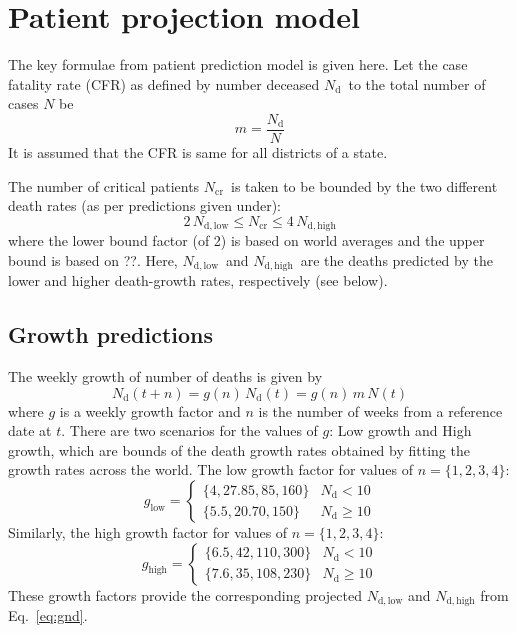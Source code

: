 \documentclass{article}
\newcommand{\nd}{\ensuremath{N_{\mathrm{d}}}}
\newcommand{\ndl}{\ensuremath{N_{\mathrm{d,low}}}}
\newcommand{\ndh}{\ensuremath{N_{\mathrm{d,high}}}}
\newcommand{\ncr}{\ensuremath{N_{\mathrm{cr}}}}
\begin{document}
\appendix
\section{Patient projection model}
The key formulae from patient prediction model \cite{ansualok20} is
given here. Let the case fatality rate (CFR) as defined by number
deceased \nd\ to
the total number of cases $N$ be
\begin{equation}
  m = \frac{\nd}{N}
\end{equation}
It is assumed that the CFR is same for all districts of a state.


The number of critical patients \ncr\ is taken to be bounded by the
two different death rates (as per predictions given under):
\begin{equation}
  2 \, \ndl \leq \ncr \leq 4 \, \ndh
\end{equation}
where the lower bound factor (of 2) is based on world averages\cite{who19mar} and
the upper bound is based on ??. Here, \ndl\ and \ndh\ are the deaths predicted by
the lower and higher death-growth rates, respectively (see below). 

\subsection{Growth predictions}
The weekly growth of number of deaths is given by
\begin{equation}
  \label{eq:gnd}
  \nd(t+n) = g(n) \, \nd(t)  = g(n) \, m \, N(t)
\end{equation}
where $g$ is a weekly growth factor and $n$ is the number of weeks
from a reference date at $t$.  There are two scenarios for the values
of $g$: Low growth and High growth, which are bounds of the death
growth rates obtained by fitting the growth rates across the
world\cite{ansualok20}.  The low growth
factor for values of $n = \{1, 2, 3, 4\}$:
\begin{equation}
  g_{\mathrm{low}} = \begin{cases}
   \{4, 27.85, 85, 160\}  & \nd < 10 \\
   \{5.5, 20. 70, 150\} & \nd \geq 10
 \end{cases}
\end{equation}
Similarly, the high growth factor for values of $n = \{1, 2, 3, 4\}$:
\begin{equation}
  g_{\mathrm{high}} = \begin{cases}
   \{6.5, 42, 110, 300\}  & \nd < 10 \\
   \{7.6, 35, 108, 230\} & \nd \geq 10
 \end{cases}
\end{equation}
These growth factors provide the corresponding projected $\ndl$ and $\ndh$ from
Eq.~\eqref{eq:gnd}.





\end{document}
